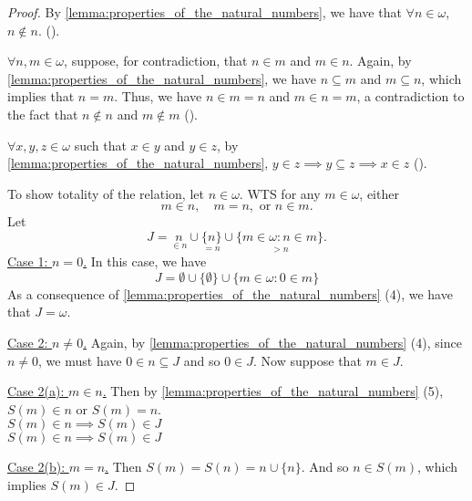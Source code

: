 \documentclass[notoc,notitlepage]{tufte-book}
\begin{document}
\begin{proof}
  By \cref{lemma:properties_of_the_natural_numbers}, we have that $\forall n \in \omega$, $n \notin n$. ().

  \noindent $\forall n, m \in \omega$, suppose, for contradiction, that $n \in m$ and $m \in n$. Again, by \cref{lemma:properties_of_the_natural_numbers}, we have $n \subseteq m$ and $m \subseteq n$, which implies that $n = m$. Thus, we have $n \in m = n$ and $m \in n = m$, a contradiction to the fact that $n \notin n$ and $m \notin m$ ().

  \noindent $\forall x, y, z \in \omega$ such that $x \in y$ and $y \in z$, by \cref{lemma:properties_of_the_natural_numbers}, $y \in z \implies y \subseteq z \implies x \in z$ ().

  To show totality of the relation, let $n \in \omega$. WTS for any $m \in \omega$, either
  \begin{equation*}
    m \in n, \quad m = n, \text{ or } n \in m.
  \end{equation*}
  Let
  \begin{equation*}
    J = \underset{ \in n }{n} \cup \underset{= n}{ \{ n \} } \cup \underset{> n}{ \{ m \in \omega : n \in m \} }.
  \end{equation*}
  \noindent\underline{Case 1: $n = 0$.} In this case, we have
  \begin{equation*}
    J = \emptyset \cup \{ \emptyset \} \cup \{ m \in \omega : 0 \in m \}
  \end{equation*}
  As a consequence of \cref{lemma:properties_of_the_natural_numbers} (4), we have that $J = \omega$.

  \noindent\underline{Case 2: $n \neq 0$.} Again, by \cref{lemma:properties_of_the_natural_numbers} (4), since $n \neq 0$, we must have $0 \in n \subseteq J$ and so $0 \in J$. Now suppose that $m \in J$.

  \underline{Case 2(a): $m \in n$.} Then by \cref{lemma:properties_of_the_natural_numbers} (5), $S(m) \in n$ or $S(m) = n$.\\
  $S(m) \in n \implies S(m) \in J$\\
  $S(m) \in n \implies S(m) \in J$

  \underline{Case 2(b): $m = n$.} Then $S(m) = S(n) = n \cup \{ n \}$. And so $n \in S(m)$, which implies $S(m) \in J$.


\end{proof}
\end{document}
